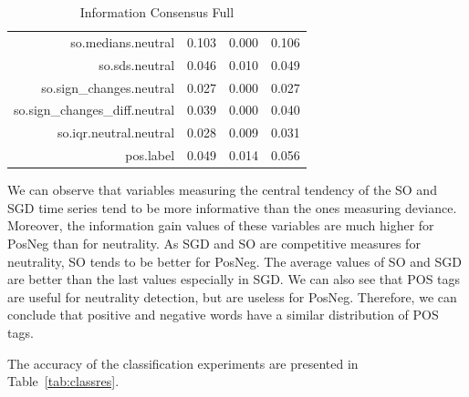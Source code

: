 \documentclass{sig-alternate}
\begin{document}
\begin{table}[ht]
\begin{tabular}{rrrr}
  so.medians.neutral & 0.103 & 0.000 & 0.106 \\ 
  so.sds.neutral & 0.046 & 0.010 & 0.049 \\ 
  so.sign\_changes.neutral & 0.027 & 0.000 & 0.027 \\ 
  so.sign\_changes\_diff.neutral & 0.039 & 0.000 & 0.040 \\ 
  so.iqr.neutral.neutral & 0.028 & 0.009 & 0.031 \\ 
  pos.label & 0.049 & 0.014 & 0.056 \\ 
   \hline
\end{tabular}
\caption{Information Consensus Full} 
\end{table}


We can observe that variables measuring the central tendency of the SO and SGD time series tend to be more informative than the ones measuring deviance. Moreover, the information gain values of these variables are much higher for PosNeg than for neutrality. As SGD and SO are competitive measures for neutrality, SO tends to be better for PosNeg. The average values of SO and SGD are better than the last values especially in SGD. We can also see that POS tags are useful for neutrality detection, but are useless for PosNeg. Therefore, we can conclude that positive and negative words have a similar distribution of POS tags. 


The accuracy of the classification experiments are presented in Table~\ref{tab:classres}. 
\end{document}
